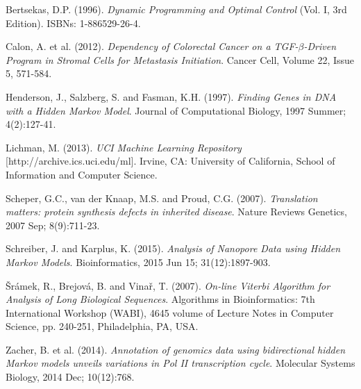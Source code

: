 \documentclass[a4paper, 11pt]{article} %
\begin{document}
\begin{thebibliography}{9}

Bertsekas, D.P. (1996).
\textit{Dynamic Programming and Optimal Control} (Vol. I, 3rd Edition). ISBNs: 1-886529-26-4.

Calon, A. et al. (2012).
\textit{Dependency of Colorectal Cancer on a TGF-$\beta$-Driven Program in Stromal Cells for Metastasis Initiation}.
Cancer Cell, Volume 22, Issue 5, 571-584.

Henderson, J., Salzberg, S. and Fasman, K.H. (1997).
\textit{Finding Genes in DNA with a Hidden Markov Model}.
Journal of Computational Biology, 1997 Summer; 4(2):127-41.

Lichman, M. (2013).
\textit{UCI Machine Learning Repository} [http://archive.ics.uci.edu/ml]. Irvine, CA: University of California, School of Information and Computer Science.

Scheper, G.C., van der Knaap, M.S. and Proud, C.G. (2007).
\textit{Translation matters: protein synthesis defects in inherited disease}.
Nature Reviews Genetics, 2007 Sep; 8(9):711-23.

Schreiber, J. and Karplus, K. (2015).
\textit{Analysis of Nanopore Data using Hidden Markov Models}.
Bioinformatics, 2015 Jun 15; 31(12):1897-903.

\v{S}r\'amek, R., Brejov\'a, B. and Vina\v{r}, T. (2007).
\textit{On-line Viterbi Algorithm for Analysis of Long Biological Sequences}.
Algorithms in Bioinformatics: 7th International Workshop (WABI), 4645 volume of Lecture Notes in Computer Science, pp. 240-251, Philadelphia, PA, USA.

Zacher, B. et al. (2014).
\textit{Annotation of genomics data using bidirectional hidden Markov models unveils variations in Pol II transcription cycle}.
Molecular Systems Biology, 2014 Dec; 10(12):768. 

\end{thebibliography}
\end{document}
